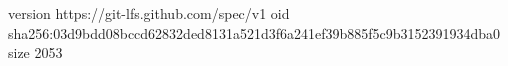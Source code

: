 version https://git-lfs.github.com/spec/v1
oid sha256:03d9bdd08bccd62832ded8131a521d3f6a241ef39b885f5c9b3152391934dba0
size 2053
